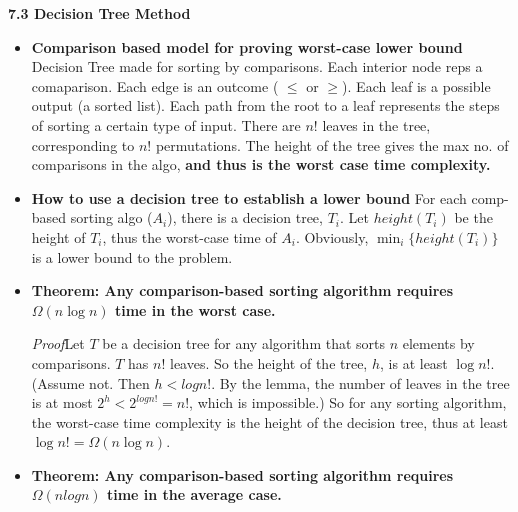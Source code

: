\textbf{7.3 Decision Tree Method}
\begin{itemize}
    \item \textbf{Comparison based model for proving worst-case lower bound}
    Decision Tree made for sorting by comparisons. Each interior node reps a comaparison. Each edge is an outcome ( $\le$ or $\ge$). Each leaf is a possible output (a sorted list). Each path from the root to a leaf represents the steps of sorting a certain type of input. There are $n!$ leaves in the tree, corresponding to $n!$ permutations. The height of the tree gives the max no. of comparisons in the algo, \textbf{and thus is the worst case time complexity.} 
    \item \textbf{How to use a decision tree to establish a lower bound}
    For each comp-based sorting algo ($A_i$), there is a decision tree, $T_i$. Let $height(T_i)$ be the height of $T_i$, thus the worst-case time of $A_i$. Obviously, $\min_i\{height(T_i)\}$ is a lower bound to the problem.

    \item \textbf{Theorem: Any comparison-based sorting algorithm requires
    $\Omega(n\log n)$ time in the worst case.}

    {\em Proof}\quad Let $T$ be a decision tree for any algorithm that
    sorts $n$ elements by comparisons. $T$ has $n!$ leaves. So the height
    of the tree, $h$, is at least $\log n!$. (Assume not. Then $h<log n!$.
    By the lemma, the number of leaves in the tree is at most $2^h<2^{log n!}
    =n!$, which is impossible.) So for any sorting algorithm, the worst-case
    time complexity is the height of the decision tree, thus at least $\log n!
    =\Omega(n\log n)$.

    \item \textbf{Theorem: Any comparison-based sorting algorithm requires $\Omega(nlogn)$ time in the average case.}
    
\end{itemize}

